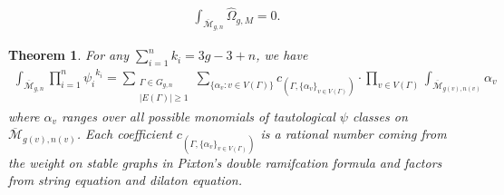 \documentclass[10pt,a4paper]{amsart}
\newtheorem{theorem}{Theorem}
\begin{document}
\begin{align}\label{eqn:int-trr-3g-3+n}
\int_{\overline{\mathcal{M}}_{g,n}}\widehat{\Omega}_{g,M} =0. 
\end{align}

\begin{theorem}\label{thm:algo-inter}
  For any $\sum_{i=1}^{n}k_i=3g-3+n$, we have
\begin{align}\label{eqn:deg-3g-3+n-push-algo-int}
\int_{\overline{\mathcal{M}}_{g,n}}  \prod_{i=1}^{n}{\psi_i}^{k_i}   =\sum_{\substack{\Gamma\in G_{g,n}\\ |E(\Gamma)|\geq1}}\sum_{\{\alpha_{v}:v\in V(\Gamma)\}} c_{(\Gamma,\{\alpha_v\}_{v\in V(\Gamma)})}\cdot \prod_{v\in V(\Gamma)}\int_{\overline{\mathcal{M}}_{g(v),n(v)}}\alpha_{v}  
\end{align}
where  $\alpha_v$ ranges over all possible  monomials of tautological $\psi$ classes on $\overline{\mathcal{M}}_{g(v),n(v)}$.
Each coefficient $c_{(\Gamma,\{\alpha_v\}_{v\in V(\Gamma)})}$ is a rational number coming from the weight on stable graphs in Pixton's double ramifcation formula and factors from string equation and dilaton equation.        
\end{theorem}
\end{document}
